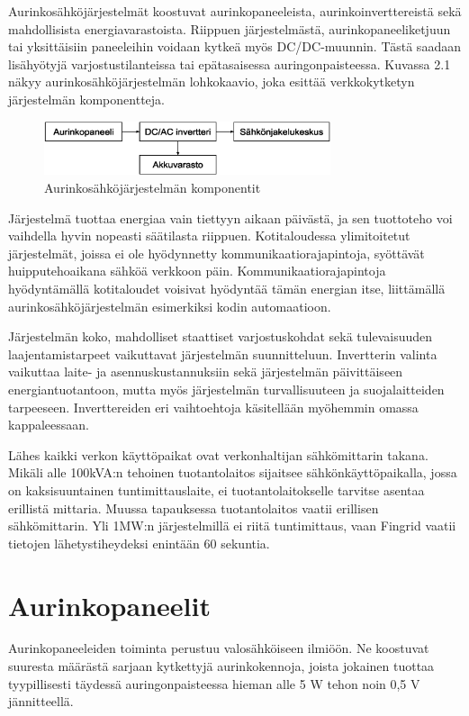 Aurinkosähköjärjestelmät koostuvat aurinkopaneeleista, aurinkoinverttereistä sekä mahdollisista energiavarastoista. Riippuen järjestelmästä, aurinkopaneeliketjuun tai yksittäisiin paneeleihin voidaan kytkeä myös DC/DC-muunnin. Tästä saadaan lisähyötyjä varjostustilanteissa tai epätasaisessa auringonpaisteessa.  Kuvassa 2.1 näkyy aurinkosähköjärjestelmän lohkokaavio, joka esittää verkkokytketyn järjestelmän komponentteja.
\begin{figure}
  \centering
  \includegraphics[width=0.75\textwidth]{figures/PV_system_components}
  \caption{Aurinkosähköjärjestelmän komponentit}
\end{figure}

Järjestelmä tuottaa energiaa vain tiettyyn aikaan päivästä, ja sen tuottoteho voi vaihdella hyvin nopeasti säätilasta riippuen. Kotitaloudessa ylimitoitetut järjestelmät, joissa ei ole hyödynnetty kommunikaatiorajapintoja, syöttävät huipputehoaikana sähköä verkkoon päin. Kommunikaatiorajapintoja hyödyntämällä kotitaloudet voisivat hyödyntää tämän energian itse, liittämällä aurinkosähköjärjestelmän esimerkiksi kodin automaatioon.

Järjestelmän koko, mahdolliset staattiset varjostuskohdat sekä tulevaisuuden laajentamistarpeet vaikuttavat järjestelmän suunnitteluun. Invertterin valinta vaikuttaa laite- ja asennuskustannuksiin sekä järjestelmän päivittäiseen energiantuotantoon, mutta myös järjestelmän turvallisuuteen ja suojalaitteiden tarpeeseen. Inverttereiden eri vaihtoehtoja käsitellään myöhemmin omassa kappaleessaan.

Lähes kaikki verkon käyttöpaikat ovat verkonhaltijan sähkömittarin takana. Mikäli alle 100kVA:n tehoinen tuotantolaitos sijaitsee sähkönkäyttöpaikalla, jossa on kaksisuuntainen tuntimittauslaite, ei tuotantolaitokselle tarvitse asentaa erillistä mittaria. Muussa tapauksessa tuotantolaitos vaatii erillisen sähkömittarin. Yli 1MW:n järjestelmillä ei riitä tuntimittaus, vaan Fingrid vaatii tietojen lähetystiheydeksi enintään 60 sekuntia. \parencite{VJV2018}

\section{Aurinkopaneelit}
  Aurinkopaneeleiden toiminta perustuu valosähköiseen ilmiöön. Ne koostuvat suuresta määrästä sarjaan kytkettyjä aurinkokennoja, joista jokainen tuottaa tyypillisesti täydessä auringonpaisteessa hieman alle 5 W tehon noin 0,5 V jännitteellä. \parencite{Messenger}

